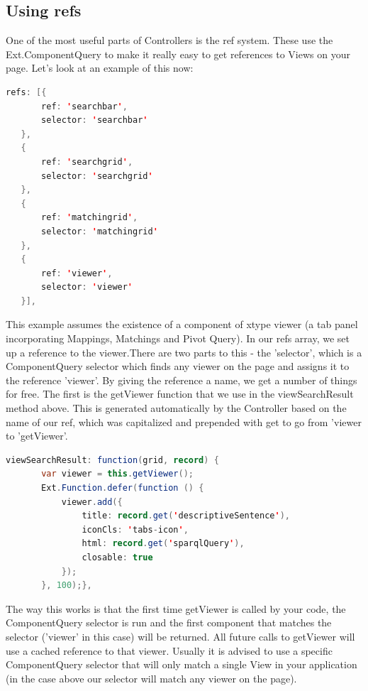 \subsection{Using refs} 
\par One of the most useful parts of Controllers is the ref system. These use the Ext.ComponentQuery to make it really easy to get references to Views on your page. Let's look at an example of this now: \\
\begin{lstlisting}[language=Java]
refs: [{
       ref: 'searchbar',
       selector: 'searchbar'
   },
   {
       ref: 'searchgrid',
       selector: 'searchgrid'
   },
   {
       ref: 'matchingrid',
       selector: 'matchingrid'
   },  
   {
       ref: 'viewer',
       selector: 'viewer'
   }],
\end{lstlisting}
\par This example assumes the existence of a component of xtype viewer (a tab panel incorporating Mappings, Matchings and Pivot Query). 
In our refs array, we set up a reference to the viewer.There are two parts to this - the 'selector', which is a ComponentQuery selector which finds any viewer on the page and assigns it to the reference 'viewer'. By giving the reference a name, we get a number of things for free. The first is the getViewer function that we use in the  viewSearchResult method above. This is generated automatically by the Controller based on the name of our ref, which was capitalized and prepended with get to go from 'viewer to 'getViewer'. \\
\begin{lstlisting}[language=Java]
viewSearchResult: function(grid, record) {
       var viewer = this.getViewer();
       Ext.Function.defer(function () {
           viewer.add({
               title: record.get('descriptiveSentence'),
               iconCls: 'tabs-icon',
               html: record.get('sparqlQuery'),
               closable: true
           });
       }, 100);},
\end{lstlisting} 
\par The way this works is that the first time getViewer is called by your code, the ComponentQuery selector is run and the first component that matches the selector ('viewer' in this case) will be returned. All future calls to getViewer will use a cached reference to that viewer. Usually it is advised to use a specific ComponentQuery selector that will only match a single View in your application (in the case above our selector will match any viewer on the page). \\
